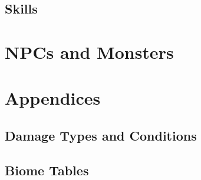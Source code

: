 \documentclass{book}
\begin{document}
\chapter{Skills}

\part{NPCs and Monsters}

\part{Appendices}
\begin{appendices}
\chapter{Damage Types and Conditions}
\chapter{Biome Tables}

\end{appendices}
\end{document}

